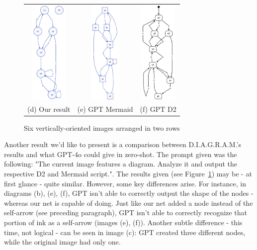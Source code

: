 \documentclass[conference]{IEEEtran}
\begin{document}
\begin{figure}[h!]
	\begin{tabular}{ccc}
		\includegraphics[height=5cm]{ex4.png} &
		\includegraphics[height=5cm]{chat3.png} &
		\includegraphics[height=5cm]{chat4.png} \\
		(d) Our result & (e) GPT Mermaid & (f) GPT D2 \\
	\end{tabular}
	
	\caption{Six vertically-oriented images arranged in two rows}
	\label{fig:chat}
	
\end{figure}

Another result we'd like to present is a comparison between D.I.A.G.R.A.M.'s results and what GPT-4o could give in zero-shot. The prompt given was the following: "The current image features a diagram. Analyze it and output the respective D2 and Mermaid script.". The results given (see Figure~\ref{fig:chat}) may be - at first glance - quite similar. However, some key differences arise. For instance, in diagrams (b), (e), (f), GPT isn't able to correctly output the shape of the nodes - whereas our net is capable of doing. Just like our net added a node instead of the self-arrow (see preceding paragraph), GPT isn't able to correctly recognize that portion of ink as a self-arrow (images (e), (f)). Another subtle difference - this time, not logical - can be seen in image (c): GPT created three different nodes, while the original image had only one.
\end{document}

